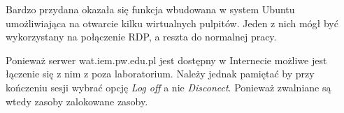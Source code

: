 \documentclass{article}
\begin{document}
Bardzo przydana okazała się funkcja wbudowana w system Ubuntu umożliwiająca na otwarcie kilku wirtualnych pulpitów. Jeden z nich mógł być wykorzystany na połączenie RDP, a reszta do normalnej pracy.

Ponieważ serwer wat.iem.pw.edu.pl jest dostępny w Internecie możliwe jest łączenie się z nim z poza laboratorium. Należy jednak pamiętać by przy kończeniu sesji wybrać opcję \textit{Log off} a nie \textit{Disconect}. Ponieważ zwalniane są wtedy zasoby zalokowane zasoby.
\end{document}
